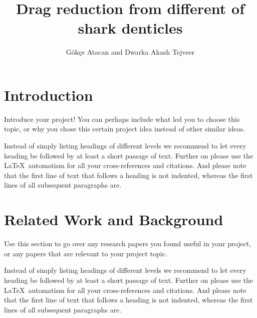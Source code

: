 \documentclass[graybox]{svmult}
\begin{document}
\title*{Drag reduction from different of shark denticles}
\author{Gökçe Atacan and Dwarka Akash Tejveer}
%
%
\maketitle



\section{Introduction}
\label{sec:1}
Introduce your project! You can perhaps include what led you to choose this topic, or why you chose this certain project idea instead of other similar ideas.

Instead of simply listing headings of different levels we recommend to let every heading be followed by at least a short passage of text.  Further on please use the \LaTeX\ automatism for all your cross-references and citations. And please note that the first line of text that follows a heading is not indented, whereas the first lines of all subsequent paragraphs are.

\section{Related Work and Background}
\label{sec:2}
Use this section to go over any research papers you found useful in your project, or any papers that are relevant to your project topic.

Instead of simply listing headings of different levels we recommend to let every heading be followed by at least a short passage of text.  Further on please use the \LaTeX\ automatism for all your cross-references and citations. And please note that the first line of text that follows a heading is not indented, whereas the first lines of all subsequent paragraphs are.
\end{document}

